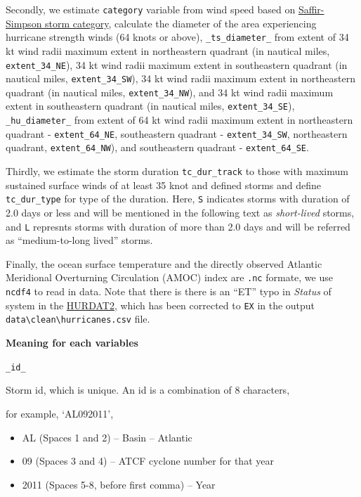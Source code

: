 \documentclass[]{book}
\begin{document}
Secondly, we estimate \texttt{category} variable from wind speed based on \href{https://www.nhc.noaa.gov/aboutsshws.php}{Saffir-Simpson storm category}, calculate the diameter of the area experiencing hurricane strength winds (64 knots or above), \texttt{\_ts\_diameter\_} from extent of 34 kt wind radii maximum extent in northeastern quadrant (in nautical miles, \texttt{extent\_34\_NE}), 34 kt wind radii maximum extent in southeastern quadrant (in nautical miles, \texttt{extent\_34\_SW}), 34 kt wind radii maximum extent in northeastern quadrant (in nautical miles, \texttt{extent\_34\_NW}), and 34 kt wind radii maximum extent in southeastern quadrant (in nautical miles, \texttt{extent\_34\_SE}), \texttt{\_hu\_diameter\_} from extent of 64 kt wind radii maximum extent in northeastern quadrant - \texttt{extent\_64\_NE}, southeastern quadrant - \texttt{extent\_34\_SW}, northeastern quadrant, \texttt{extent\_64\_NW}), and southeastern quadrant - \texttt{extent\_64\_SE}.

Thirdly, we estimate the storm duration \texttt{tc\_dur\_track} to those with maximum sustained surface winds of at least 35 knot and defined storms and define \texttt{tc\_dur\_type} for type of the duration. Here, \texttt{S} indicates storms with duration of 2.0 days or less and will be mentioned in the following text as \emph{short-lived} storms, and \texttt{L} represnts storms with duration of more than 2.0 days and will be referred as ``medium-to-long lived'' storms.

Finally, the ocean surface temperature and the directly observed Atlantic Meridional Overturning Circulation (AMOC) index are \texttt{.nc} formate, we use \texttt{ncdf4} to read in data. Note that there is there is an ``ET'' typo in \emph{Status} of system in the \href{https://www.nhc.noaa.gov/data/hurdat/hurdat2-1851-2018-120319.txt}{HURDAT2}, which has been corrected to \texttt{EX} in the output \texttt{data\textbackslash{}clean\textbackslash{}hurricanes.csv} file.

\textbf{Meaning for each variables}

\texttt{\_id\_}

Storm id, which is unique. An id is a combination of 8 characters,

for example, `AL092011',

\begin{itemize}
\item
  AL (Spaces 1 and 2) -- Basin -- Atlantic
\item
  09 (Spaces 3 and 4) -- ATCF cyclone number for that year
\item
  2011 (Spaces 5-8, before first comma) -- Year
\end{itemize}
\end{document}
